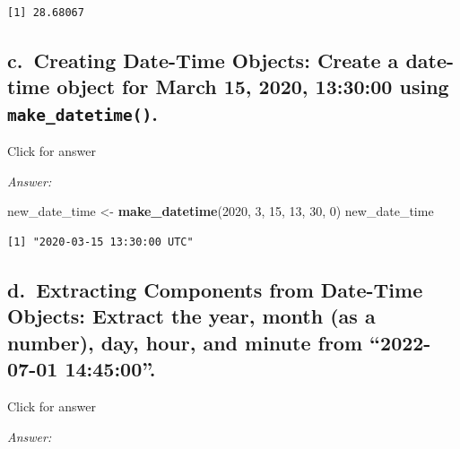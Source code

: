 \documentclass[
]{book}
\newenvironment{Shaded}{\begin{snugshade}}{\end{snugshade}}
\newcommand{\DecValTok}[1]{\textcolor[rgb]{0.00,0.00,0.81}{#1}}
\newcommand{\FunctionTok}[1]{\textcolor[rgb]{0.13,0.29,0.53}{\textbf{#1}}}
\newcommand{\NormalTok}[1]{#1}
\newcommand{\OtherTok}[1]{\textcolor[rgb]{0.56,0.35,0.01}{#1}}
\begin{document}
\begin{verbatim}
[1] 28.68067
\end{verbatim}

\hypertarget{c.-creating-date-time-objects-create-a-date-time-object-for-march-15-2020-133000-using-make_datetime.}{%
\subsection{\texorpdfstring{c.~Creating Date-Time Objects: Create a date-time object for March 15, 2020, 13:30:00 using \texttt{make\_datetime()}.}{c.~Creating Date-Time Objects: Create a date-time object for March 15, 2020, 13:30:00 using make\_datetime().}}\label{c.-creating-date-time-objects-create-a-date-time-object-for-march-15-2020-133000-using-make_datetime.}}

Click for answer

\emph{Answer:}

\begin{Shaded}
\begin{Highlighting}[]
\NormalTok{new\_date\_time }\OtherTok{\textless{}{-}} \FunctionTok{make\_datetime}\NormalTok{(}\DecValTok{2020}\NormalTok{, }\DecValTok{3}\NormalTok{, }\DecValTok{15}\NormalTok{, }\DecValTok{13}\NormalTok{, }\DecValTok{30}\NormalTok{, }\DecValTok{0}\NormalTok{)}
\NormalTok{new\_date\_time}
\end{Highlighting}
\end{Shaded}

\begin{verbatim}
[1] "2020-03-15 13:30:00 UTC"
\end{verbatim}

\hypertarget{d.-extracting-components-from-date-time-objects-extract-the-year-month-as-a-number-day-hour-and-minute-from-2022-07-01-144500.}{%
\subsection{d.~Extracting Components from Date-Time Objects: Extract the year, month (as a number), day, hour, and minute from ``2022-07-01 14:45:00''.}\label{d.-extracting-components-from-date-time-objects-extract-the-year-month-as-a-number-day-hour-and-minute-from-2022-07-01-144500.}}

Click for answer

\emph{Answer:}
\end{document}
